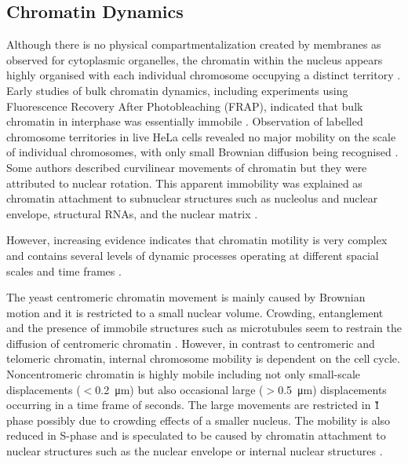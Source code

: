   \subsection{Chromatin Dynamics}
    Although there is no physical compartmentalization created by
    membranes as observed for cytoplasmic organelles, the chromatin within the
    nucleus appears highly organised with each individual chromosome
    occupying a distinct territory \citep{cremer2006chromosome}.
    Early studies of bulk chromatin dynamics, including experiments
    using Fluorescence Recovery After Photobleaching (FRAP),
    indicated that bulk chromatin in interphase was
    essentially immobile \citep{abney1997chromatin}.  Observation of
    labelled chromosome territories in live HeLa cells revealed no
    major mobility on the scale of individual chromosomes, with only small
    Brownian diffusion being recognised \citep{edelmann2001morphology}.
    Some authors
    described curvilinear movements of chromatin but they were
    attributed to nuclear rotation.  This apparent immobility was
    explained as chromatin attachment to subnuclear structures
    such as nucleolus and nuclear envelope, structural RNAs, and the
    nuclear matrix \citep{de1986curvilinear, parvinen1976chromosome}.

    However, increasing evidence indicates that chromatin motility is
    very complex and contains several levels of dynamic processes
    operating at different spacial scales and time frames
    \citep{hubner2010chromatin}.

    The yeast 
    centromeric chromatin movement is mainly caused by
    Brownian motion and it is restricted to a small nuclear volume.
    Crowding, entanglement and the presence of immobile structures
    such as microtubules seem to restrain the diffusion of centromeric
    chromatin \citep{marshall1997interphase}.  However, in contrast to
    centromeric and telomeric chromatin, internal chromosome mobility
    is dependent on the cell cycle. Noncentromeric chromatin is highly
    mobile including not only small-scale displacements
    ($<$\SI{0.2}{\micro\meter}) but also occasional large
    ($>$\SI{0.5}{\micro\meter}) displacements occurring in
    a time frame of seconds.
    The large movements are restricted in \G1 phase possibly due to
    crowding effects of a smaller nucleus.  The mobility is also
    reduced in S-phase and is speculated to be caused by chromatin
    attachment to nuclear structures such as the nuclear envelope or
    internal nuclear structures \citep{heun2001chromosome}.

